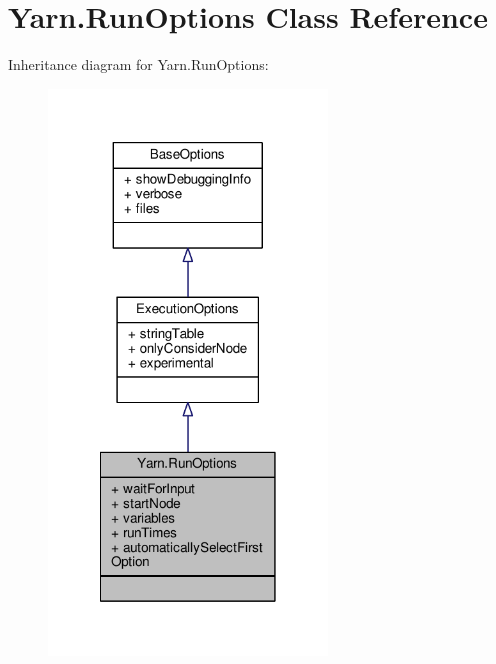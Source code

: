 \hypertarget{a00157}{\section{Yarn.\-Run\-Options Class Reference}
\label{a00157}
}


Inheritance diagram for Yarn.\-Run\-Options\-:
\nopagebreak
\begin{figure}[H]
\begin{center}
\leavevmode
\includegraphics[width=210pt]{a00741}
\end{center}
\end{figure}


